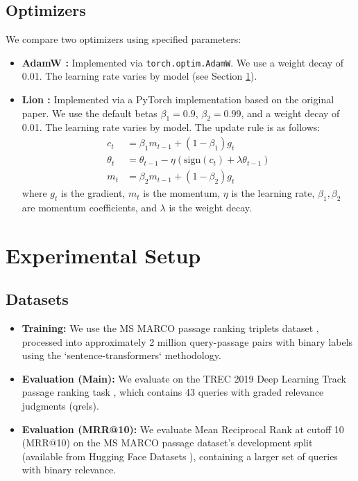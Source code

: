 \documentclass[conference]{IEEEtran}
\begin{document}
\subsection{Optimizers}
We compare two optimizers using specified parameters:
\begin{itemize}
    \item \textbf{AdamW \cite{loshchilov2019decoupled}:} Implemented via \texttt{torch.optim.AdamW}. We use a weight decay of 0.01. The learning rate varies by model (see Section \ref{sec:experimental_setup}).
    \item \textbf{Lion \cite{chen2023symbolic}:} Implemented via a PyTorch implementation based on the original paper. We use the default betas $\beta_1 = 0.9$, $\beta_2 = 0.99$, and a weight decay of 0.01. The learning rate varies by model. The update rule is as follows:
    \begin{align*}
    c_t &= \beta_1 m_{t-1} + (1 - \beta_1) g_t \\
    \theta_t &= \theta_{t-1} - \eta \left( \text{sign}(c_t) + \lambda \theta_{t-1} \right) \\
    m_t &= \beta_2 m_{t-1} + (1 - \beta_2) g_t
    \end{align*}
    where $g_t$ is the gradient, $m_t$ is the momentum, $\eta$ is the learning rate, $\beta_1, \beta_2$ are momentum coefficients, and $\lambda$ is the weight decay.
\end{itemize}

\section{Experimental Setup}
\label{sec:experimental_setup}

\subsection{Datasets}
\begin{itemize}
    \item \textbf{Training:} We use the MS MARCO passage ranking triplets dataset \cite{bajaj2016ms}, processed into approximately 2 million query-passage pairs with binary labels using the `sentence-transformers` methodology.
    \item \textbf{Evaluation (Main):} We evaluate on the TREC 2019 Deep Learning Track passage ranking task \cite{craswell2020overview}, which contains 43 queries with graded relevance judgments (qrels).
    \item \textbf{Evaluation (MRR@10):} We evaluate Mean Reciprocal Rank at cutoff 10 (MRR@10) on the MS MARCO passage dataset's development split (available from Hugging Face Datasets \cite{DBLP:journals/corr/NguyenRSGTMD16}), containing a larger set of queries with binary relevance.
\end{itemize}
\end{document}
